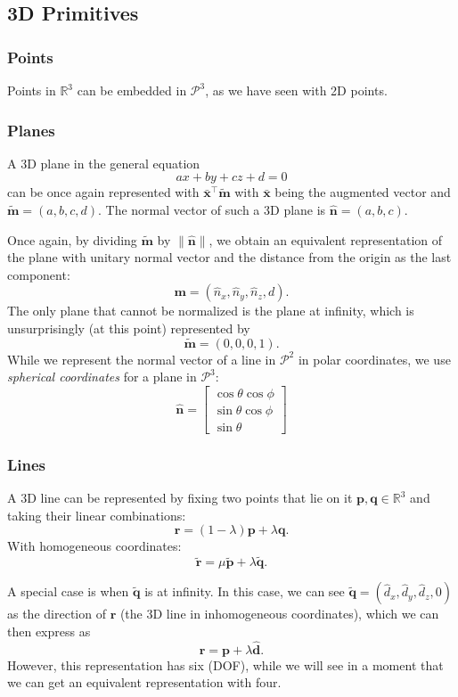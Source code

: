 \subsection{3D Primitives}

\subsubsection{Points}
Points in $\mathbb{R}^3$ can be embedded in $\mathcal{P}^3$, as we have seen with 2D points.

\subsubsection{Planes}
A 3D plane in the general equation
$$ax+by+cz+d=0$$
can be once again represented with $\bar{\mathbf{x}}^{\top}\tilde{\mathbf{m}}$ with $\bar{\mathbf{x}}$ being the augmented vector and $\tilde{\mathbf{m}}=(a,b,c,d)$. The normal vector of such a 3D plane is $\hat{\mathbf{n}}=(a,b,c)$.

Once again, by dividing $\tilde{\mathbf{m}}$ by $\| \hat{\mathbf{n}} \|$, we obtain an equivalent representation of the plane with unitary normal vector and the distance from the origin as the last component:
$$\mathbf{m}=(\hat{n}_{x},\hat{n}_{y},\hat{n}_{z},d).$$
The only plane that cannot be normalized is the plane at infinity, which is unsurprisingly (at this point) represented by
$$\tilde{\mathbf{m}}=(0,0,0,1).$$
While we represent the normal vector of a line in $\mathcal{P}^2$ in polar coordinates, we use \emph{spherical coordinates} for a plane in $\mathcal{P}^3$:
$$\hat{\mathbf{n}}=\begin{bmatrix}
\cos \theta \cos \phi \\
\sin \theta \cos \phi \\
\sin \theta
\end{bmatrix}$$

\subsubsection{Lines}
A 3D line can be represented by fixing two points that lie on it $\mathbf{p},\mathbf{q}\in \mathbb{R}^3$ and taking their linear combinations:
$$\mathbf{r}=(1-\lambda)\mathbf{p}+\lambda \mathbf{q}.$$
With homogeneous coordinates:
$$\tilde{\mathbf{r}}=\mu \tilde{\mathbf{p}} + \lambda \tilde{\mathbf{q}}.$$

A special case is when $\tilde{\mathbf{q}}$ is at infinity. In this case, we can see $\tilde{\mathbf{q}}=(\hat{d}_{x},\hat{d}_{y},\hat{d}_{z},0)$ as the direction of $\mathbf{r}$ (the 3D line in inhomogeneous coordinates), which we can then express as
$$\mathbf{r}=\mathbf{p}+\lambda\hat{\mathbf{d}}.$$
However, this representation has six  (DOF), while we will see in a moment that we can get an equivalent representation with four.

